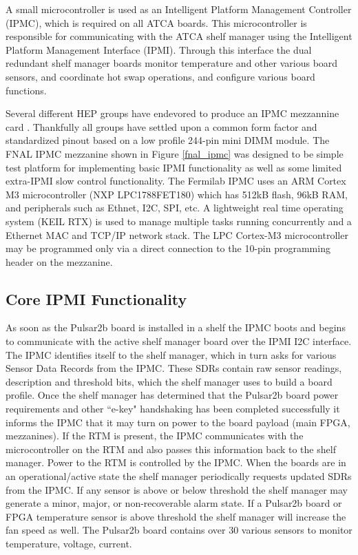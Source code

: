 \documentclass[letterpaper]{article}
\begin{document}
A small microcontroller is used as an Intelligent Platform Management Controller (IPMC), which is required on all ATCA boards. This microcontroller is responsible for communicating with the ATCA shelf manager using the Intelligent Platform Management Interface (IPMI).  Through this interface the dual redundant shelf manager boards monitor temperature and other various board sensors, and coordinate hot swap operations, and configure various board functions.

Several different HEP groups have endevored to produce an IPMC mezzannine card \cite{lapp_ipmc}\cite{cern_ipmc}\cite{wisc_ipmc}.  Thankfully all groups have settled upon a common form factor and standardized pinout based on a low profile 244-pin mini DIMM module.  The FNAL IPMC mezzanine shown in Figure \ref{fnal_ipmc} was designed to be simple test platform for implementing basic IPMI functionality as well as some limited extra-IPMI slow control functionality.  The Fermilab IPMC uses an ARM Cortex M3 microcontroller (NXP LPC1788FET180) which has 512kB flash, 96kB RAM, and peripherals such as Ethnet, I2C, SPI, etc.  A lightweight real time operating system (KEIL RTX) is used to manage multiple tasks running concurrently and a Ethernet MAC and TCP/IP network stack.  The LPC Cortex-M3 microcontroller may be programmed only via a direct connection to the 10-pin programming header on the mezzanine.

\subsection{Core IPMI Functionality}

As soon as the Pulsar2b board is installed in a shelf the IPMC boots and begins to communicate with the active shelf manager board over the IPMI I2C interface.  The IPMC identifies itself to the shelf manager, which in turn asks for various Sensor Data Records from the IPMC.  These SDRs contain raw sensor readings, description and threshold bits, which the shelf manager uses to build a board profile.  Once the shelf manager has determined that the Pulsar2b board power requirements and other ``e-key" handshaking has been completed successfully it informs the IPMC that it may turn on power to the board payload (main FPGA, mezzanines).  If the RTM is present, the IPMC communicates with the microcontroller on the RTM and also passes this information back to the shelf manager.  Power to the RTM is controlled by the IPMC.  When the boards are in an operational/active state the shelf manager periodically requests updated SDRs from the IPMC.  If any sensor is above or below threshold the shelf manager may generate a minor, major, or non-recoverable alarm state.  If a Pulsar2b board or FPGA temperature sensor is above threshold the shelf manager will increase the fan speed as well.  The Pulsar2b board contains over 30 various sensors to monitor temperature, voltage, current.
\end{document}
